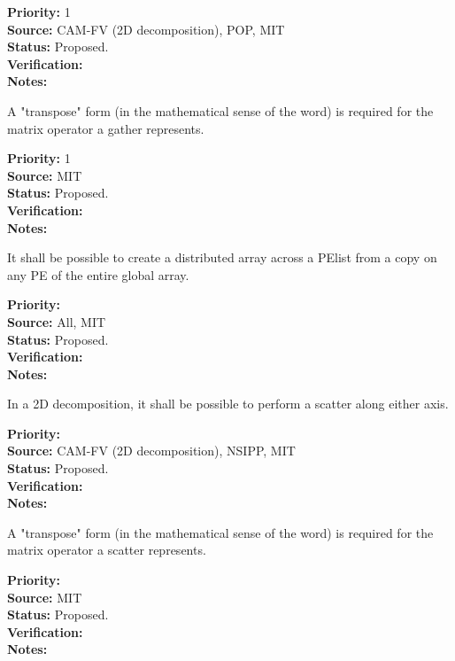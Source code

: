 \begin{reqlist}
{\bf Priority:} 1 \\ 
{\bf Source:} CAM-FV (2D decomposition), POP, MIT \\
{\bf Status:} Proposed. \\
{\bf Verification:} \\
{\bf Notes:} 
\end{reqlist}

A "transpose" form (in the mathematical sense of the word) is required
for the matrix operator a gather represents.
\begin{reqlist}
{\bf Priority:} 1 \\ 
{\bf Source:}  MIT \\
{\bf Status:} Proposed. \\
{\bf Verification:} \\
{\bf Notes:}
\end{reqlist}


It shall be possible to create a distributed array across a PElist
from a copy on any PE of the entire global array.

\begin{reqlist}
{\bf Priority:} \\ 
{\bf Source:} All, MIT \\
{\bf Status:} Proposed. \\
{\bf Verification:} \\
{\bf Notes:} 
\end{reqlist}


In a 2D decomposition, it shall be possible to perform a scatter along
either axis.

\begin{reqlist}
{\bf Priority:} \\ 
{\bf Source:} CAM-FV (2D decomposition), NSIPP, MIT \\
{\bf Status:} Proposed. \\
{\bf Verification:} \\
{\bf Notes:} 
\end{reqlist}

A "transpose" form (in the mathematical sense of the word) is required
for the matrix operator a scatter represents.
\begin{reqlist}
{\bf Priority:} \\ 
{\bf Source:}  MIT \\
{\bf Status:} Proposed. \\
{\bf Verification:} \\
{\bf Notes:}
\end{reqlist}

